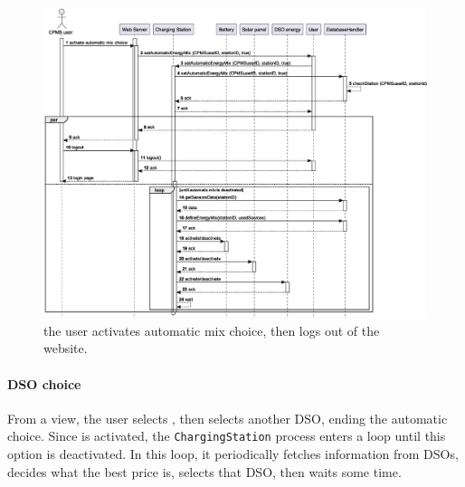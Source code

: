 \begin{figure}[h!]
    \centering
    \includegraphics[width=\columnwidth]{./images/sequences/cpms/energyMix}
    \caption{the user activates automatic mix choice, then logs out of the website.}
\end{figure}

\pagebreak

\paragraph{DSO choice} From a  view, the user selects , then selects another DSO, ending the automatic choice. Since  is activated, the \texttt{ChargingStation} process enters a loop until this option is deactivated. In this loop, it periodically fetches information from DSOs, decides what the best price is, selects that DSO, then waits some time.

